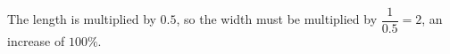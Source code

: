 The length is multiplied by $0.5$, so the width must be multiplied by $\dfrac1{0.5}=2$, an increase of $\boxed{100\%}$.
